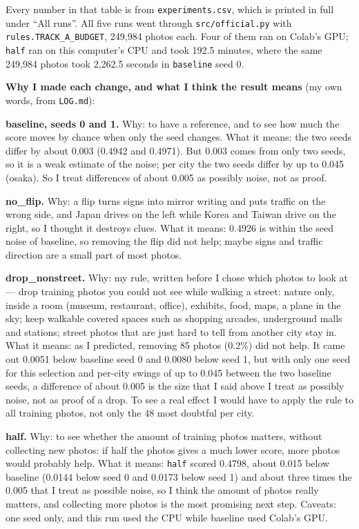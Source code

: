 \documentclass[11pt]{article}
\begin{document}
Every number in that table is from \texttt{experiments.csv}, which is printed in
full under ``All runs''. All five runs went through \texttt{src/official.py} with
\texttt{rules.TRACK\_A\_BUDGET}, 249,984 photos each. Four of them ran on Colab's
GPU; \texttt{half} ran on this computer's CPU and took 192.5 minutes, where the
same 249,984 photos took 2,262.5 seconds in \texttt{baseline} seed 0.

\textbf{Why I made each change, and what I think the result means} (my own words,
from \texttt{LOG.md}):

\textbf{baseline, seeds 0 and 1.} Why: to have a reference, and to see how much
the score moves by chance when only the seed changes. What it means: the two
seeds differ by about 0.003 (0.4942 and 0.4971). But 0.003 comes from only two
seeds, so it is a weak estimate of the noise; per city the two seeds differ by
up to 0.045 (osaka). So I treat differences of about 0.005 as possibly noise,
not as proof.

\textbf{no\_flip.} Why: a flip turns signs into mirror writing and puts traffic
on the wrong side, and Japan drives on the left while Korea and Taiwan drive on
the right, so I thought it destroys clues. What it means: 0.4926 is within the
seed noise of baseline, so removing the flip did not help; maybe signs and
traffic direction are a small part of most photos.

\textbf{drop\_nonstreet.} Why: my rule, written before I chose which photos to
look at --- drop training photos you could not see while walking a street:
nature only, inside a room (museum, restaurant, office), exhibits, food, maps, a
plane in the sky; keep walkable covered spaces such as shopping arcades,
underground malls and stations; street photos that are just hard to tell from
another city stay in. What it means: as I predicted, removing 85 photos
(0.2\%) did not help. It came out 0.0051 below baseline seed 0 and 0.0080 below
seed 1, but with only one seed for this selection and per-city swings of up to
0.045 between the two baseline seeds, a difference of about 0.005 is the size
that I said above I treat as possibly noise, not as proof of a drop. To see a
real effect I would have to apply the rule to all training photos, not only the
48 most doubtful per city.

\textbf{half.} Why: to see whether the amount of training photos matters,
without collecting new photos: if half the photos gives a much lower score, more
photos would probably help. What it means: \texttt{half} scored 0.4798, about
0.015 below baseline (0.0144 below seed 0 and 0.0173 below seed 1) and about
three times the 0.005 that I treat as possible noise, so I think the amount of
photos really matters, and collecting more photos is the most promising next
step. Caveats: one seed only, and this run used the CPU while baseline used
Colab's GPU.
\end{document}
